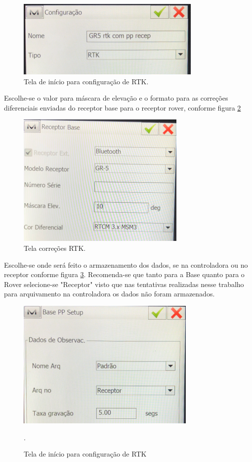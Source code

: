 \begin{figure}[H]
\centering
\includegraphics[scale=0.5]{pfc_pdf_files/img/controladora_conf.png} %
\caption{Tela de início para configuração de RTK.}
\label{controladora_conf}
\end{figure}

Escolhe-se o valor para máscara de elevação e o formato para as correções diferenciais enviadas do receptor base para o receptor rover, conforme figura \ref{controladora_cor}

\begin{figure}[H]
\centering
\includegraphics[scale=0.5]{pfc_pdf_files/img/controladora_2.png} %
\caption{Tela correções RTK.}
\label{controladora_cor}
\end{figure}

Escolhe-se onde será feito o armazenamento dos dados, se na controladora ou no receptor conforme figura \ref{controladora_arq}. Recomenda-se que tanto para a Base quanto para o Rover selecione-se "Receptor" visto que nas tentativas realizadas nesse trabalho para arquivamento na controladora os dados não foram armazenados.

\begin{figure}[H]
\centering
\includegraphics[scale=0.5]{pfc_pdf_files/img/controladora_arq.png} %
\caption{Tela de início para configuração de RTK}.
\label{controladora_arq}
\end{figure}

